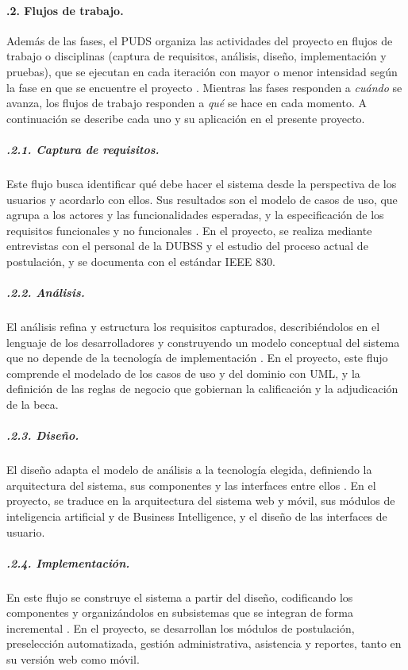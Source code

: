 \paragraph{.2. Flujos de trabajo.}\label{sec:puds_flujos}
Además de las fases, el PUDS organiza las actividades del proyecto en flujos de trabajo o disciplinas (captura de requisitos, análisis, diseño, implementación y pruebas), que se ejecutan en cada iteración con mayor o menor intensidad según la fase en que se encuentre el proyecto \parencite{jacobson1999unified}. Mientras las fases responden a \textit{cuándo} se avanza, los flujos de trabajo responden a \textit{qué} se hace en cada momento. A continuación se describe cada uno y su aplicación en el presente proyecto.

\subparagraph{.2.1. Captura de requisitos.}\label{sec:puds_requisitos}
Este flujo busca identificar qué debe hacer el sistema desde la perspectiva de los usuarios y acordarlo con ellos. Sus resultados son el modelo de casos de uso, que agrupa a los actores y las funcionalidades esperadas, y la especificación de los requisitos funcionales y no funcionales \parencite{jacobson1999unified}. En el proyecto, se realiza mediante entrevistas con el personal de la DUBSS y el estudio del proceso actual de postulación, y se documenta con el estándar IEEE 830.

\subparagraph{.2.2. Análisis.}\label{sec:puds_analisis}
El análisis refina y estructura los requisitos capturados, describiéndolos en el lenguaje de los desarrolladores y construyendo un modelo conceptual del sistema que no depende de la tecnología de implementación \parencite{jacobson1999unified}. En el proyecto, este flujo comprende el modelado de los casos de uso y del dominio con UML, y la definición de las reglas de negocio que gobiernan la calificación y la adjudicación de la beca.

\subparagraph{.2.3. Diseño.}\label{sec:puds_diseno}
El diseño adapta el modelo de análisis a la tecnología elegida, definiendo la arquitectura del sistema, sus componentes y las interfaces entre ellos \parencite{jacobson1999unified}. En el proyecto, se traduce en la arquitectura del sistema web y móvil, sus módulos de inteligencia artificial y de Business Intelligence, y el diseño de las interfaces de usuario.

\subparagraph{.2.4. Implementación.}\label{sec:puds_implementacion}
En este flujo se construye el sistema a partir del diseño, codificando los componentes y organizándolos en subsistemas que se integran de forma incremental \parencite{jacobson1999unified}. En el proyecto, se desarrollan los módulos de postulación, preselección automatizada, gestión administrativa, asistencia y reportes, tanto en su versión web como móvil.

